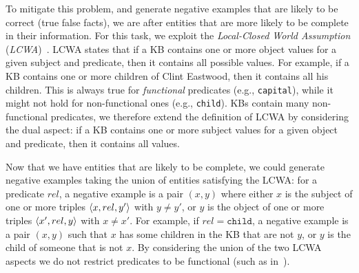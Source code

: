 To mitigate this problem, and generate negative examples that are likely to be correct (true false facts), we are after entities that are more likely to be complete in their information. For this task, we %
exploit the \emph{Local-Closed World Assumption} (\emph{LCWA})~\cite{dong2014knowledge,galarraga2015fast}. LCWA states that if a KB contains one or more object values for a given subject and predicate, then it contains all possible values. For example, if a KB contains one or more children of Clint Eastwood, then it contains all his children. This is always true for \emph{functional} predicates (e.g., \texttt{capital}), 
while it might not hold for non-functional ones (e.g., \texttt{child}). 
KBs contain many non-functional predicates, we therefore extend the definition of LCWA by considering the dual aspect: if a KB contains one or more subject values for a given object and predicate, then it contains all values. 

Now that we have entities that are likely to be complete, we could generate negative examples taking the union of entities satisfying the LCWA: 
for a predicate $rel$, a negative example is a pair $(x,y)$ where either $x$ is the subject of one or more triples $\langle x,rel,y'\rangle$ with $y \neq y'$, or $y$ is the object of one or more triples $\langle x',rel,y\rangle$ with $x \neq x'$. 
For example, if $rel=\texttt{child}$, a negative example is a pair $(x,y)$ such that $x$ has some children in the KB that are not $y$, or $y$ is the child of someone that is not $x$. By considering the union of the two LCWA aspects we do not restrict predicates to be functional (such as in~\cite{galarraga2015fast}). 

